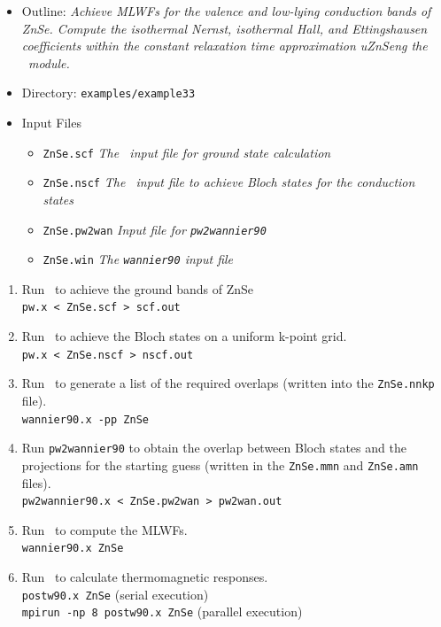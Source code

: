 \documentclass[a4paper,11pt,twoside]{article}
\begin{document}
\begin{itemize}
\item{Outline: \it{Achieve MLWFs for the valence and low-lying
    conduction bands of ZnSe. Compute the isothermal Nernst, isothermal Hall, and Ettingshausen coefficients  within the constant relaxation time approximation uZnSeng the \nw\ module.}} 
\end{itemize}
\begin{itemize}
  \item{Directory: {\tt examples/example33}}
  \item{Input Files}
    \begin{itemize}
      \item{ {\tt ZnSe.scf}  {\it The \pwscf\ input file for ground state
	  calculation}}
      \item{ {\tt ZnSe.nscf}  {\it The \pwscf\ input file to achieve Bloch
	  states for the conduction states}} 
      \item{ {\tt ZnSe.pw2wan}  {\it Input file for {\tt pw2wannier90}}}
      \item{ {\tt ZnSe.win}  {\it The {\tt wannier90} input file}}
    \end{itemize}
\end{itemize}


\begin{enumerate}
\item Run \pwscf\ to achieve the ground bands of ZnSe\\  
{\tt pw.x < ZnSe.scf > scf.out}

\item Run \pwscf\ to achieve the Bloch states on a uniform k-point
  grid.\\ 
{\tt pw.x < ZnSe.nscf > nscf.out}

\item Run \wannier\ to generate a list of the required overlaps (written
  into the {\tt ZnSe.nnkp} file).\\
{\tt wannier90.x -pp ZnSe}

\item Run {\tt pw2wannier90} to obtain the overlap between Bloch
  states and the projections for the starting guess (written in the
  {\tt ZnSe.mmn} and {\tt  ZnSe.amn} files).\\
{\tt pw2wannier90.x < ZnSe.pw2wan > pw2wan.out}

\item Run \wannier\ to compute the MLWFs.\\
{\tt wannier90.x ZnSe}


\item Run \postw\ to calculate thermomagnetic responses.\\
{\tt postw90.x ZnSe} (serial execution) \\
{\tt mpirun -np 8 postw90.x ZnSe} (parallel execution) 
\end{enumerate}
\end{document}
